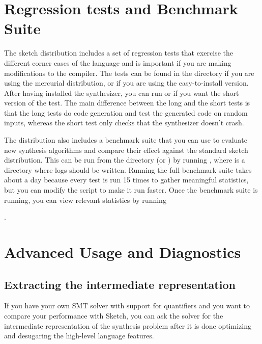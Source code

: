 \section{Regression tests and Benchmark Suite}

The sketch distribution includes a set of regression tests that exercise the different corner cases of the language and is important if you are making modifications to the compiler. The tests can be found in the directory  if you are using the mercurial distribution, or  if you are using the easy-to-install version. After having installed the synthesizer, you can run  or  if you want the short version of the test. The main difference between the long and the short tests is that the long tests do code generation and test the generated code on random inputs, whereas the short test only checks that the synthesizer doesn't crash.

The distribution also includes a benchmark suite that you can use to evaluate new synthesis algorithms and compare their effect against the standard sketch distribution. This can be run from the  directory (or ) by running , where  is a directory where logs should be written. Running the full benchmark suite takes about a day because every test is run 15 times to gather meaningful statistics, but you can modify the script to make it run faster. Once the benchmark suite is running, you can view relevant statistics by running 

.

\section{Advanced Usage and Diagnostics}

\subsection{Extracting the intermediate representation}
If you have your own SMT solver with support for quantifiers and you want to compare your performance with Sketch, you can ask the solver for the intermediate representation of the synthesis problem after it is done optimizing and desugaring the high-level language features. 


